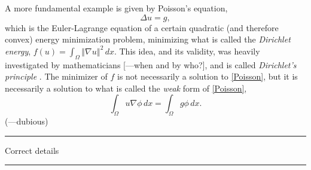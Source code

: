 \documentclass{article}
\newcommand{\norm}[1]{\left\Vert#1\right\Vert}
\newcommand{\todo}[1]{\vskip 0.1in \hrule \vskip 0.03in {#1} \vskip 0.03in \hrule \vskip 0.1in}
\begin{document}
A more fundamental example is given by Poisson's equation,
\begin{equation}\label{Poisson}
    \Delta u = g,
\end{equation}
which is the Euler-Lagrange equation of a certain quadratic (and therefore convex) energy minimization problem, minimizing what is called the \textit{Dirichlet energy},
$f(u) = \int_\Omega \norm{\nabla u}^2\,dx.$
This idea, and its validity, was heavily investigated by mathematicians [---when and by who?], and is called \textit{Dirichlet's principle} \cite{dirichlet_principle}. The minimizer of $f$ is not necessarily a solution to \eqref{Poisson}, but it is necessarily a solution to what is called
the \textit{weak} form of \eqref{Poisson},
\begin{equation}\label{WeakPoisson}
    \int_\Omega u \nabla \phi\,dx  = \int_\Omega g\phi\,dx.
\end{equation}
(---dubious)
\todo{Correct details}
\end{document}
